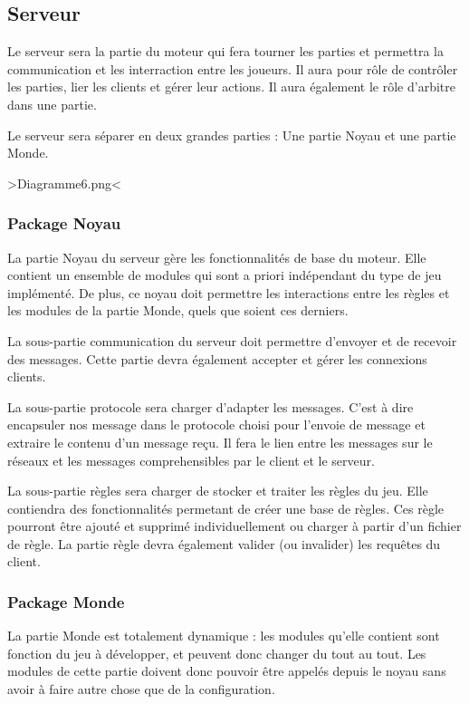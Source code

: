 \documentclass[a4paper,10pt]{report}
\begin{document}
\subsection{Serveur}

Le serveur sera la partie du moteur qui fera tourner les parties et permettra la communication et les interraction entre les joueurs. Il aura pour rôle de contrôler les parties, lier les clients et gérer leur actions. Il aura également le rôle d'arbitre dans une partie. 

Le serveur sera séparer en deux grandes parties : Une partie Noyau et une partie Monde.

>Diagramme6.png<

\subsubsection{Package Noyau}

La partie Noyau du serveur gère les fonctionnalités de base du moteur. Elle contient un ensemble de modules qui sont a priori indépendant du type de jeu implémenté. De plus, ce noyau doit permettre les interactions entre les règles et les modules de la partie Monde, quels que soient ces derniers. 

La sous-partie communication du serveur doit permettre d'envoyer et de recevoir des messages. Cette partie devra également accepter et gérer les connexions clients.

La sous-partie protocole sera charger d'adapter les messages. C'est à dire encapsuler nos message dans le protocole choisi pour l'envoie de message et extraire le contenu d'un message reçu. Il fera le lien entre les messages sur le réseaux et les messages comprehensibles par le client et le serveur.

La sous-partie règles sera charger de stocker et traiter les règles du jeu. Elle contiendra des fonctionnalités permetant de créer une base de règles. Ces règle pourront être ajouté et supprimé individuellement ou charger à partir d'un fichier de règle. La partie règle devra également valider (ou invalider) les requêtes du client.

\subsubsection{Package Monde}

La partie Monde est totalement dynamique : les modules qu'elle contient sont fonction du jeu à développer, et peuvent donc changer du tout au tout. Les modules de cette partie doivent donc pouvoir être appelés depuis le noyau sans avoir à faire autre chose que de la configuration. 
\end{document}
